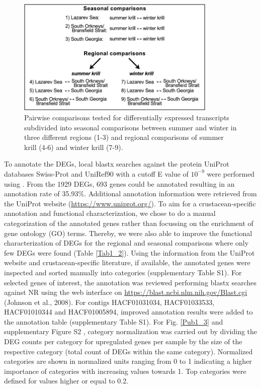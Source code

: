 \begin{figure} 
        \centering
        \includegraphics[width=0.85\textwidth]{../Figures/Pub1_2.pdf}
        \caption{Pairwise comparisons tested for differentially
        expressed transcripts subdivided into seasonal comparisons between
        summer and winter in three different regions (1-3) and regional
        comparisons of summer krill (4-6) and winter krill (7-9).}
        \label{Pub1_2}
\end{figure}

To annotate the DEGs, local blastx searches against the protein UniProt
databases Swiss-Prot and UniRef90 \citep{boutet_uniprotkb/swiss-prot_2007} with
a cutoff E value of $10^{-9}$ were performed using 
\citep{camacho_blast+:_2009}.  From the 1929 DEGs, 693 genes could be annotated
resulting in an annotation rate of 35.93\%. Additional annotation information
were retrieved from the UniProt website (\url{https://www.uniprot.org/}). To
aim for a crustacean-specific annotation and functional characterization, we
chose to do a manual categorization of the annotated genes rather than
focussing on the enrichment of gene ontology (GO) terms. Thereby, we were also
able to improve the functional characterization of DEGs for the regional and
seasonal comparisons where only few DEGs were found (Table \ref{Tab1_2}). Using
the information from the UniProt website and crustacean-specific literature, if
available, the annotated genes were inspected and sorted manually into
categories (supplementary Table S1). For selected genes of interest, the
annotation was reviewed performing blastx searches against NR using the web
interface on \url{https://blast.ncbi.nlm.nih.gov/Blast.cgi}  (Johnson et al.,
2008). For contigs HACF01031034, HACF01033533, HACF01010344 and HACF01005894,
improved annotation results were added to the annotation table (supplementary
Table S1).  For Fig. \ref{Pub1_3} and supplementary Figure S2 , category
normalization was carried out by dividing the DEG counts per category for
upregulated genes per sample by the size of the respective category (total
count of DEGs within the same category).  Normalized categories are shown in
normalized units ranging from 0 to 1 indicating a higher importance of
categories with increasing values towards 1.  Top categories were defined for
values higher or equal to 0.2.


